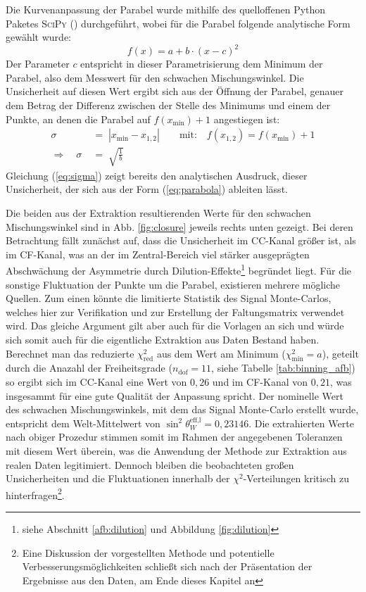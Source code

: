 Die Kurvenanpassung der Parabel wurde mithilfe des quelloffenen Python Paketes
\textsc{SciPy} (\cite{scipy}) durchgeführt, wobei für die Parabel folgende
analytische Form gewählt wurde:
\begin{equation}
    f(x)=a+b\cdot(x-c)^2
    \label{eq:parabola}
\end{equation}
Der Parameter $c$ entspricht in dieser Parametrisierung dem Minimum der
Parabel, also dem Messwert für den schwachen Mischungswinkel. Die Unsicherheit
auf diesen Wert ergibt sich aus der Öffnung der Parabel, genauer dem Betrag der
Differenz zwischen der Stelle des Minimums und einem der Punkte, an denen die
Parabel auf $f(x_\text{min})+1$ angestiegen ist:
\begin{align}
    \sigma \;&=\; |x_\text{min} - x_{1,2}|
        \qquad \text{mit:} \quad f(x_{1,2}) = f(x_\text{min})+1
        \\[5pt]
    \Longrightarrow \quad \sigma \;&=\; \sqrt{\frac{1}{b}}
    \label{eq:sigma}
\end{align}
Gleichung (\ref{eq:sigma}) zeigt bereits den analytischen Ausdruck, dieser
Unsicherheit, der sich aus der Form (\ref{eq:parabola}) ableiten lässt.

Die beiden aus der Extraktion resultierenden Werte für den schwachen
Mischungswinkel sind in Abb. \ref{fig:closure} jeweils rechts unten gezeigt.
Bei deren Betrachtung fällt zunächst auf, dass die Unsicherheit im
\ac{CC}-Kanal größer ist, als im \ac{CF}-Kanal, was an der im Zentral-Bereich
viel stärker ausgeprägten Abschwächung der Asymmetrie durch
Dilution-Effekte\footnote{siehe Abschnitt \ref{afb:dilution} und Abbildung
\ref{fig:dilution}} begründet liegt. Für die sonstige Fluktuation der Punkte um
die Parabel, existieren mehrere mögliche Quellen. Zum einen könnte die
limitierte Statistik des Signal Monte-Carlos, welches hier zur Verifikation und
zur Erstellung der Faltungsmatrix verwendet wird. Das gleiche Argument gilt
aber auch für die Vorlagen an sich und würde sich somit auch für die
eigentliche Extraktion aus Daten Bestand haben. Berechnet man das reduzierte
$\chi^2_\text{red}$ aus dem Wert am Minimum ($\chi^2_\text{min} = a$), geteilt
durch die Anazahl der Freiheitsgrade ($n_\text{dof} = 11$, siehe Tabelle
\ref{tab:binning_afb}) so ergibt sich im \ac{CC}-Kanal eine Wert von $0,26$
und im \ac{CF}-Kanal von $0,21$, was insgesammt für eine gute Qualität der
Anpassung spricht. Der nominelle Wert des schwachen Mischungswinkels, mit dem
das Signal Monte-Carlo erstellt wurde, entspricht dem Welt-Mittelwert von
$\sin^2\theta_W^\text{eff,l}=0,23146$. Die extrahierten Werte nach obiger
Prozedur stimmen somit im Rahmen der angegebenen Toleranzen mit diesem Wert
überein, was die Anwendung der Methode zur Extraktion aus realen Daten
legitimiert. Dennoch bleiben die beobachteten großen Unsicherheiten und die
Fluktuationen innerhalb der $\chi^2$-Verteilungen kritisch zu
hinterfragen\footnote{Eine Diskussion der vorgestellten Methode und potentielle
Verbesserungsmöglichkeiten schließt sich nach der Präsentation der Ergebnisse
aus den Daten, am Ende dieses Kapitel an}.

